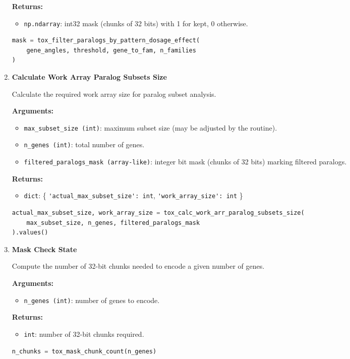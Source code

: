 \begin{enumerate}
        \textbf{Returns:}
        \begin{itemize}
            \item \lstinline!np.ndarray!: int32 mask (chunks of 32 bits) with 1 for kept, 0 otherwise.
        \end{itemize}

\begin{lstlisting}[language=Python, caption={Dosage Effect Pattern Filtering}]
mask = tox_filter_paralogs_by_pattern_dosage_effect(
    gene_angles, threshold, gene_to_fam, n_families
)
\end{lstlisting}


    \item \textbf{Calculate Work Array Paralog Subsets Size}

        Calculate the required work array size for paralog subset analysis.

        \textbf{Arguments:}
        \begin{itemize}
            \item \lstinline!max_subset_size (int)!: maximum subset size (may be adjusted by the routine).
            \item \lstinline!n_genes (int)!: total number of genes.
            \item \lstinline!filtered_paralogs_mask (array-like)!: integer bit mask (chunks of 32 bits) marking filtered paralogs.
        \end{itemize}

        \textbf{Returns:}
        \begin{itemize}
            \item \lstinline!dict!: \{ \lstinline!'actual_max_subset_size': int!, \lstinline!'work_array_size': int! \}
        \end{itemize}

\begin{lstlisting}[language=Python, caption={Work Array Size Calculation}]
actual_max_subset_size, work_array_size = tox_calc_work_arr_paralog_subsets_size(
    max_subset_size, n_genes, filtered_paralogs_mask
).values()
\end{lstlisting}


    \item \textbf{Mask Check State}

        Compute the number of 32-bit chunks needed to encode a given number of genes.

        \textbf{Arguments:}
        \begin{itemize}
            \item \lstinline!n_genes (int)!: number of genes to encode.
        \end{itemize}

        \textbf{Returns:}
        \begin{itemize}
            \item \lstinline!int!: number of 32-bit chunks required.
        \end{itemize}

\begin{lstlisting}[language=Python, caption={Mask Chunk Count Calculation}]
n_chunks = tox_mask_chunk_count(n_genes)
\end{lstlisting}


\end{enumerate}